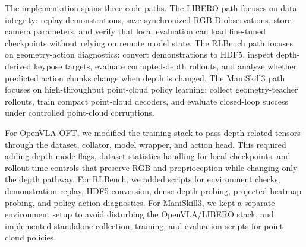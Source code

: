 \documentclass[conference]{IEEEtran}
\begin{document}
The implementation spans three code paths. The LIBERO path focuses on data integrity: replay demonstrations, save synchronized RGB-D observations, store camera parameters, and verify that local evaluation can load fine-tuned checkpoints without relying on remote model state. The RLBench path focuses on geometry-action diagnostics: convert demonstrations to HDF5, inspect depth-derived keypose targets, evaluate corrupted-depth rollouts, and analyze whether predicted action chunks change when depth is changed. The ManiSkill3 path focuses on high-throughput point-cloud policy learning: collect geometry-teacher rollouts, train compact point-cloud decoders, and evaluate closed-loop success under controlled point-cloud corruptions.

For OpenVLA-OFT, we modified the training stack to pass depth-related tensors through the dataset, collator, model wrapper, and action head. This required adding depth-mode flags, dataset statistics handling for local checkpoints, and rollout-time controls that preserve RGB and proprioception while changing only the depth pathway. For RLBench, we added scripts for environment checks, demonstration replay, HDF5 conversion, dense depth probing, projected heatmap probing, and policy-action diagnostics. For ManiSkill3, we kept a separate environment setup to avoid disturbing the OpenVLA/LIBERO stack, and implemented standalone collection, training, and evaluation scripts for point-cloud policies.

\begin{table}[t]
\centering
\caption{Main model variants tested.}
\label{tab:variants}
\end{table}
\end{document}
